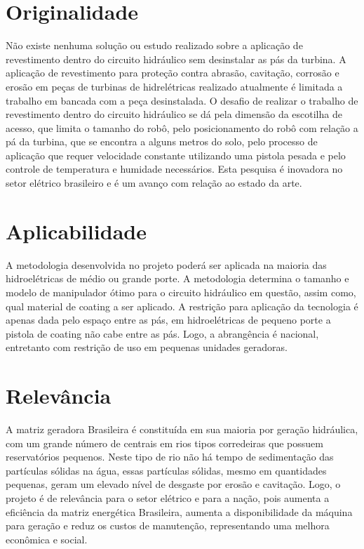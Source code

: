 \section{Originalidade}

Não existe nenhuma solução ou estudo realizado sobre a aplicação de revestimento
dentro do circuito hidráulico sem desinstalar as pás da turbina. A aplicação de
revestimento para proteção contra abrasão, cavitação, corrosão e erosão em peças
de turbinas de hidrelétricas realizado atualmente é limitada a trabalho em
bancada com a peça desinstalada. O desafio de realizar o trabalho de
revestimento dentro do circuito hidráulico se dá pela dimensão da escotilha de
acesso, que limita o tamanho do robô, pelo posicionamento do robô com relação a
pá da turbina, que se encontra a alguns metros do solo, pelo processo de
aplicação que requer velocidade constante utilizando uma pistola pesada e pelo
controle de temperatura e humidade necessários. Esta pesquisa é inovadora no
setor elétrico brasileiro e é um avanço com relação ao estado da arte.

\section{Aplicabilidade}

A metodologia desenvolvida no projeto  poderá ser aplicada na maioria das
hidroelétricas de médio ou grande porte. A metodologia determina o tamanho e
modelo de manipulador ótimo para o circuito hidráulico em questão, assim como,
qual material de coating a ser aplicado. A restrição para aplicação da tecnologia é
apenas dada pelo espaço entre as pás, em hidroelétricas de pequeno porte a
pistola de coating não cabe entre as pás. Logo, a abrangência é nacional,
entretanto com restrição de uso em pequenas unidades geradoras.

\section{Relevância}

A matriz geradora Brasileira é constituída em sua maioria por geração
hidráulica, com um grande número de centrais em rios tipos corredeiras que
possuem reservatórios pequenos. Neste tipo de rio não há tempo de sedimentação
das partículas sólidas na água, essas partículas sólidas, mesmo em quantidades
pequenas, geram um elevado nível de desgaste por erosão e cavitação. Logo, o
projeto é de relevância para o setor elétrico e para a nação, pois aumenta a
eficiência da matriz energética Brasileira, aumenta a disponibilidade da máquina
para geração e reduz os custos de manutenção, representando uma melhora
econômica e social.


